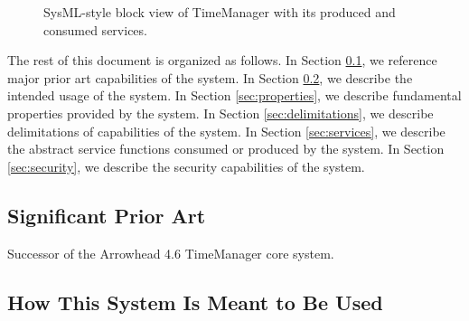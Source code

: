 \documentclass[a4paper]{arrowhead}
\begin{document}
\begin{figure}[ht!]
  \centering
  \caption{SysML-style block view of TimeManager with its produced and consumed services.}
  \label{fig:system}
\end{figure}

The rest of this document is organized as follows.
In Section \ref{sec:prior_art}, we reference major prior art capabilities of the system.
In Section \ref{sec:use}, we describe the intended usage of the system.
In Section \ref{sec:properties}, we describe fundamental properties provided by the system.
In Section \ref{sec:delimitations}, we describe delimitations of capabilities of the system.
In Section \ref{sec:services}, we describe the abstract service functions consumed or produced by the system.
In Section \ref{sec:security}, we describe the security capabilities of the system.

\newpage

\subsection{Significant Prior Art}
\label{sec:prior_art}

Successor of the Arrowhead 4.6 TimeManager core system.

\subsection{How This System Is Meant to Be Used}
\label{sec:use}
\end{document}
